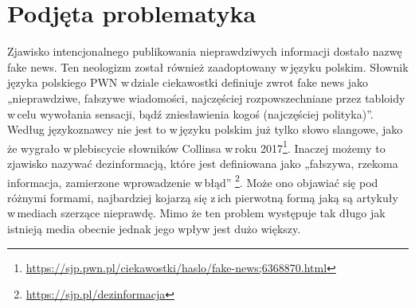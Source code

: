 
\newpage %
\section{Podjęta problematyka}
Zjawisko intencjonalnego publikowania nieprawdziwych informacji dostało nazwę fake news. 
Ten neologizm został również zaadoptowany w\,języku polskim. Słownik języka polskiego PWN w\,dziale ciekawostki definiuje zwrot fake news jako „nieprawdziwe, fałszywe wiadomości, najczęściej rozpowszechniane przez tabloidy w\,celu wywołania sensacji, bądź zniesławienia kogoś (najczęściej polityka)”. Według językoznawcy nie jest to w\,języku polskim już tylko słowo slangowe, jako że wygrało w\,plebiscycie słowników Collinsa w\,roku 2017\footnote{\url{https://sjp.pwn.pl/ciekawostki/haslo/fake-news;6368870.html}}.  Inaczej możemy to zjawisko nazywać dezinformacją, które jest definiowana jako „fałszywa, rzekoma informacja, zamierzone wprowadzenie w\,błąd” \footnote{\url{https://sjp.pl/dezinformacja}}. 
Może ono objawiać się pod różnymi formami, najbardziej kojarzą się z\,ich pierwotną formą jaką są artykuły w\,mediach szerzące nieprawdę. Mimo że ten problem występuje tak długo jak istnieją media obecnie jednak jego wpływ jest dużo większy. 

